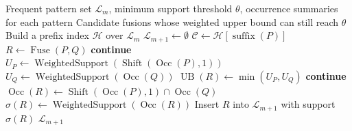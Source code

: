 \begin{algorithm}[t]
\caption{FastOPF-WB: Weighted-bound pruning for order-preserving fusion}
\label{alg:fastopf-wb}
\begin{algorithmic}[1]
\Require Frequent pattern set $\mathcal{L}_m$, minimum support threshold $\theta$, occurrence summaries for each pattern
\Ensure Candidate fusions whose weighted upper bound can still reach $\theta$
\State Build a prefix index $\mathcal{H}$ over $\mathcal{L}_m$
\State $\mathcal{L}_{m+1} \gets \emptyset$
    \State $\mathcal{C} \gets \mathcal{H}[\operatorname{suffix}(P)]$
        \State $R \gets \operatorname{Fuse}(P,Q)$
            \State \textbf{continue}
        \EndIf
        \State $U_P \gets \operatorname{WeightedSupport}(\operatorname{Shift}(\operatorname{Occ}(P),1))$
        \State $U_Q \gets \operatorname{WeightedSupport}(\operatorname{Occ}(Q))$
        \State $\operatorname{UB}(R) \gets \min(U_P,U_Q)$
            \State \textbf{continue} 
        \EndIf
        \State $\operatorname{Occ}(R) \gets \operatorname{Shift}(\operatorname{Occ}(P),1) \cap \operatorname{Occ}(Q)$
        \State $\sigma(R) \gets \operatorname{WeightedSupport}(\operatorname{Occ}(R))$
            \State Insert $R$ into $\mathcal{L}_{m+1}$ with support $\sigma(R)$
        \EndIf
    \EndFor
\EndFor
\State \Return $\mathcal{L}_{m+1}$
\end{algorithmic}
\end{algorithm}
